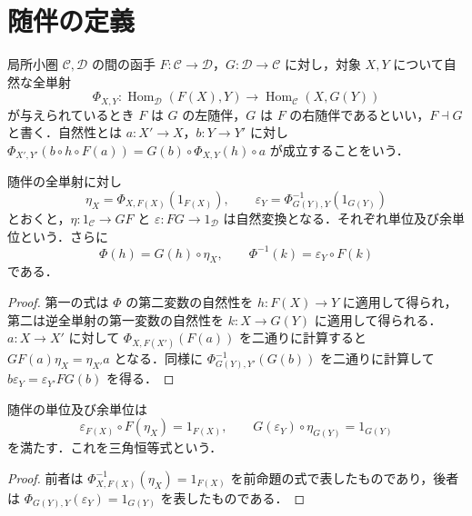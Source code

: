 \section{随伴の定義}
\begin{defn}[随伴函手]
局所小圏 $\mathcal C,\mathcal D$ の間の函手 $F:\mathcal C\to\mathcal D$，$G:\mathcal D\to\mathcal C$ に対し，対象 $X,Y$ について自然な全単射
\[
 \Phi_{X,Y}:\operatorname{Hom}_{\mathcal D}(F(X),Y)
 \longrightarrow\operatorname{Hom}_{\mathcal C}(X,G(Y))
\]
が与えられているとき $F$ は $G$ の左随伴，$G$ は $F$ の右随伴であるといい，$F\dashv G$ と書く．自然性とは $a:X'\to X$，$b:Y\to Y'$ に対し $\Phi_{X',Y'}(b\circ h\circ F(a))=G(b)\circ\Phi_{X,Y}(h)\circ a$ が成立することをいう．
\end{defn}
\begin{prop}[随伴の単位と余単位]
随伴の全単射に対し
\[
 \eta_X=\Phi_{X,F(X)}(1_{F(X)}),\qquad
 \varepsilon_Y=\Phi^{-1}_{G(Y),Y}(1_{G(Y)})
\]
とおくと，$\eta:1_{\mathcal C}\to GF$ と $\varepsilon:FG\to1_{\mathcal D}$ は自然変換となる．それぞれ単位及び余単位という．さらに
\[
 \Phi(h)=G(h)\circ\eta_X,\qquad
 \Phi^{-1}(k)=\varepsilon_Y\circ F(k)
\]
である．
\end{prop}
\begin{proof}
第一の式は $\Phi$ の第二変数の自然性を $h:F(X)\to Y$ に適用して得られ，第二は逆全単射の第一変数の自然性を $k:X\to G(Y)$ に適用して得られる．$a:X\to X'$ に対して $\Phi_{X,F(X')}(F(a))$ を二通りに計算すると $GF(a)\eta_X=\eta_{X'}a$ となる．同様に $\Phi^{-1}_{G(Y),Y'}(G(b))$ を二通りに計算して $b\varepsilon_Y=\varepsilon_{Y'}FG(b)$ を得る．
\end{proof}
\begin{prop}[随伴の三角恒等式]
随伴の単位及び余単位は
\[
 \varepsilon_{F(X)}\circ F(\eta_X)=1_{F(X)},\qquad
 G(\varepsilon_Y)\circ\eta_{G(Y)}=1_{G(Y)}
\]
を満たす．これを三角恒等式という．
\end{prop}
\begin{proof}
前者は $\Phi^{-1}_{X,F(X)}(\eta_X)=1_{F(X)}$ を前命題の式で表したものであり，後者は $\Phi_{G(Y),Y}(\varepsilon_Y)=1_{G(Y)}$ を表したものである．
\end{proof}
